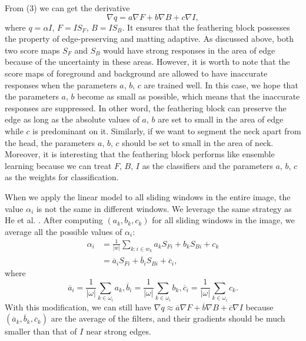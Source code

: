 \documentclass[sigconf]{acmart}
\begin{document}
From (3) we can get the derivative
\begin{equation}
 \nabla q = a\nabla F + b\nabla B + c\nabla I,
 \label{equ:proofqFBI}
\end{equation}
where $q = \alpha I$, $F = I{S_F}$, $B = I{S_B}$. It ensures that the feathering block possesses the property of edge-preserving and matting adaptive. As discussed above, both two score maps ${S_F}$ and ${S_B}$ would have strong responses in the area of edge because of the uncertainty in these areas. However, it is worth to note that the score maps of foreground and background are allowed to have inaccurate responses when the parameters $a$, $b$, $c$ are trained well. In this case, we hope that the parameters $a$, $b$ become as small as possible, which means that the inaccurate responses are suppressed. In other word, the feathering block can preserve the edge as long as the absolute values of $a$, $b$ are set to small in the area of edge while $c$ is predominant on it. Similarly, if we want to segment the neck apart from the head, the parameters $a$, $b$, $c$ should be set to small in the area of neck. Moreover, it is interesting that the feathering block performs like ensemble learning because we can treat $F$, $B$, $I$ as the classifiers and the parameters $a$, $b$, $c$ as the weights for classification.

When we apply the linear model to all sliding windows in the entire image, the value ${\alpha _i}$ is not the same in different windows. We leverage the same strategy as He et al. \cite{he2013guided}. After computing $\left( {{a_k},{b_k},{c_k}} \right)$ for all sliding windows in the image, we average all the possible values of ${\alpha _i}$:
\begin{equation}
\begin{aligned}
\alpha _i&=\frac{1}{\left| w \right|}\sum_{k:i\in w_k}{a_kS_{Fi}+b_kS_{Bi}+c_k}\\
&=\overline{a}_iS_{Fi}+\overline{b}_iS_{Bi}+\overline{c}_i,
\end{aligned}
\end{equation}
where
\begin{displaymath}
\overline{a}_i=\frac{1}{\left| \omega \right|}\sum_{k\in {\omega_i}}{a_k}, \overline{b}_i=\frac{1}{\left| \omega \right|}\sum_{k\in {\omega_i}}{b_k}, \overline{c}_i=\frac{1}{\left| \omega \right|}\sum_{k\in {\omega_i}}{c_k}.
\end{displaymath}
With this modification, we can still have $\nabla q\approx \overline{a}\nabla F+\overline{b}\nabla B+\overline{c}\nabla I$ because $\left( {{{\overline a }_k},{{\overline b }_k},{{\overline c }_k}} \right)$ are the average of the filters, and their gradients should be much smaller than that of $I$ near strong edges.
\end{document}
